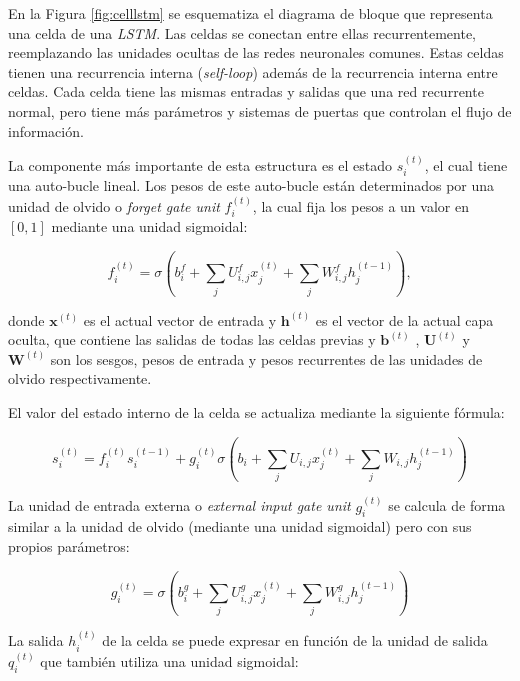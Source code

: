 	En la Figura \ref{fig:celllstm} se esquematiza el diagrama de bloque que representa una celda de una \textit{LSTM}. Las celdas se conectan entre ellas recurrentemente, reemplazando las unidades ocultas de las redes neuronales comunes. Estas celdas tienen una recurrencia interna (\textit{self-loop}) además de la recurrencia interna entre celdas. Cada celda tiene las mismas entradas y salidas que una red recurrente normal, pero tiene más parámetros y sistemas de puertas que controlan el flujo de información. 
	
	La componente más importante de esta estructura es el estado $s_i^{(t)}$, el cual tiene una auto-bucle lineal. Los pesos de este auto-bucle están determinados por una unidad de olvido o \textit{forget gate unit} $f_i^{(t)}$, la cual fija los pesos a un valor en $[0,1]$ mediante una unidad sigmoidal:
	
	\begin{equation}
		f_i^{(t)}=\sigma \left( b_i^f  + \sum_{j}U_{i,j}^f x_j^{(t)} + \sum_{j} W_{i,j}^f h_j^{(t-1)}\right),
	\end{equation}

	donde $\textbf{x}^{(t)}$ es el actual vector de entrada y $\textbf{h}^{(t)}$ es el vector de la actual capa oculta, que contiene las salidas de todas las celdas previas y $\textbf{b}^{(t)}$ , $\textbf{U}^{(t)}$  y $\textbf{W}^{(t)}$ son los sesgos, pesos de entrada y pesos recurrentes de las unidades de olvido respectivamente. 
	
	El valor del estado interno de la celda se actualiza mediante la siguiente fórmula:
	
	\begin{equation}
		s_i^{(t)} = f_i^{(t)} s_i^{(t-1)} + g_i^{(t)} \sigma \left( b_i+ \sum_{j}U_{i,j} x_j^{(t)} + \sum_{j} W_{i,j} h_j^{(t-1)}\right)
	\end{equation} 
	
	La unidad de entrada externa o \textit{external input gate unit} $g_i^{(t)}$ se calcula de forma similar a la unidad de olvido (mediante una unidad sigmoidal) pero con sus propios parámetros:
	
	\begin{equation}
	g_i^{(t)} =  \sigma \left( b_i^g+ \sum_{j}U_{i,j}^g x_j^{(t)} + \sum_{j} W_{i,j}^g h_j^{(t-1)}\right)
	\end{equation} 
	
	La salida $h_i^{(t)}$ de la celda se puede expresar en función de la unidad de salida $q_i^{(t)}$ que también utiliza una unidad sigmoidal:
	
